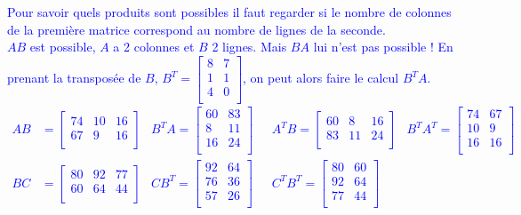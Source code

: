 \documentclass[a4paper]{article}\usepackage[]{graphicx}\usepackage[]{xcolor}
\begin{document}
\textcolor{blue}{Pour savoir quels produits sont possibles il faut regarder si le 
nombre de colonnes de la première matrice correspond au nombre de lignes 
de la seconde. \\
$AB$ est possible, $A$ a 2 colonnes et $B$ 2 lignes. Mais $BA$ lui n'est 
pas possible !
En prenant la transposée de $B$, $B^T = \begin{bmatrix} 8 &7 \\1 &1 \\4 &0 \\ \end{bmatrix}$, on peut alors faire 
le calcul $B^TA$.
\begin{align*}
    AB &= \begin{bmatrix} 74 &10 &16 \\67 &9 &16 \\ \end{bmatrix} & B^TA = \begin{bmatrix} 60 &83 \\8 &11 \\16 &24 \\ \end{bmatrix} \text{ } &  A^TB = \begin{bmatrix} 60 &8 &16 \\83 &11 &24 \\ \end{bmatrix} & B^T A^T = \begin{bmatrix} 74 &67 \\10 &9 \\16 &16 \\ \end{bmatrix}  \\ 
    BC &= \begin{bmatrix} 80 &92 &77 \\60 &64 &44 \\ \end{bmatrix} & CB^T = \begin{bmatrix} 92 &64 \\76 &36 \\57 &26 \\ \end{bmatrix} \text{ } & C^TB^T = \begin{bmatrix} 80 &60 \\92 &64 \\77 &44 \\ \end{bmatrix}\\
\end{align*}}
\end{document}
